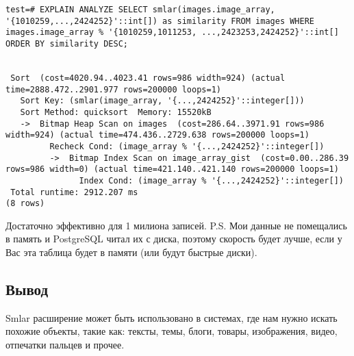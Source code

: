 \begin{lstlisting}[label=lst:smlar11,caption=Добавляем сортировку по сходству картинок]
test=# EXPLAIN ANALYZE SELECT smlar(images.image_array, '{1010259,...,2424252}'::int[]) as similarity FROM images WHERE images.image_array % '{1010259,1011253, ...,2423253,2424252}'::int[] ORDER BY similarity DESC;


 Sort  (cost=4020.94..4023.41 rows=986 width=924) (actual time=2888.472..2901.977 rows=200000 loops=1)
   Sort Key: (smlar(image_array, '{...,2424252}'::integer[]))
   Sort Method: quicksort  Memory: 15520kB
   ->  Bitmap Heap Scan on images  (cost=286.64..3971.91 rows=986 width=924) (actual time=474.436..2729.638 rows=200000 loops=1)
         Recheck Cond: (image_array % '{...,2424252}'::integer[])
         ->  Bitmap Index Scan on image_array_gist  (cost=0.00..286.39 rows=986 width=0) (actual time=421.140..421.140 rows=200000 loops=1)
               Index Cond: (image_array % '{...,2424252}'::integer[])
 Total runtime: 2912.207 ms
(8 rows)
\end{lstlisting}

Достаточно эффективно для 1 милиона записей. P.S. Мои данные не помещались в память и PostgreSQL читал их с диска, поэтому скорость будет лучше, если у Вас эта таблица будет в памяти (или будут быстрые диски).

\subsection{Вывод}

Smlar расширение может быть использовано в системах, где нам нужно искать похожие объекты, такие как: тексты, темы, блоги, товары, изображения, видео, отпечатки пальцев и прочее.